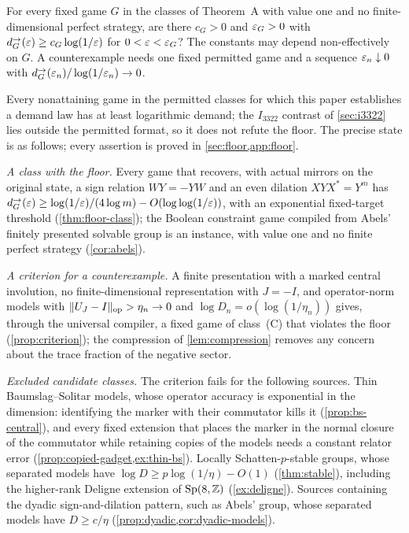 \begin{problem}\label{prob:floor}
For every fixed game $G$ in the classes of Theorem~A with value one and no finite-dimensional perfect strategy, are there $c_G>0$ and
$\varepsilon_G>0$ with $d^\to_G(\varepsilon)\ge c_G\log(1/\varepsilon)$ for $0<\varepsilon<\varepsilon_G$? The constants may depend non-effectively on $G$. A counterexample
needs one fixed permitted game and a sequence $\varepsilon_n\downarrow0$ with $d^\to_G(\varepsilon_n)/\log(1/\varepsilon_n)\to0$.
\end{problem}

Every nonattaining game in the permitted classes for which this paper establishes a demand law has at least logarithmic demand;
the $I_{3322}$ contrast of \cref{sec:i3322} lies outside the permitted format, so it does not refute the floor. The precise state is as follows; every assertion is proved in \cref{sec:floor,app:floor}.

\emph{A class with the floor.} Every game that recovers, with actual mirrors on the original state, a sign relation $WY=-YW$ and an
even dilation $XYX^*=Y^m$ has $d^\to_G(\varepsilon)\ge\log(1/\varepsilon)/(4\log m)-O(\log\log(1/\varepsilon))$, with an exponential fixed-target
threshold (\cref{thm:floor-class}); the Boolean constraint game compiled from Abels' finitely presented solvable group is an
instance, with value one and no finite perfect strategy (\cref{cor:abels}).

\emph{A criterion for a counterexample.} A finite presentation with a marked central involution, no finite-dimensional
representation with $J=-I$, and operator-norm models with $\lVert U_J-I\rVert_{\mathrm{op}}>\eta_n\to0$ and $\log D_n=o(\log(1/\eta_n))$ gives, through
the universal compiler, a fixed game of class~(C) that violates the floor (\cref{prop:criterion}); the compression of
\cref{lem:compression} removes any concern about the trace fraction of the negative sector.

\emph{Excluded candidate classes.} The criterion fails for the following sources. Thin Baumslag--Solitar models, whose operator
accuracy is exponential in the dimension: identifying the marker with their commutator kills it (\cref{prop:bs-central}), and every
fixed extension that places the marker in the normal closure of the commutator while retaining copies of the models needs a constant
relator error (\cref{prop:copied-gadget,ex:thin-bs}). Locally Schatten-$p$-stable groups, whose separated models have
$\log D\ge p\log(1/\eta)-O(1)$ (\cref{thm:stable}), including the higher-rank Deligne extension of $\mathrm{Sp}(8,\mathbb Z)$ (\cref{ex:deligne}).
Sources containing the dyadic sign-and-dilation pattern, such as Abels' group, whose separated models have $D\ge c/\eta$
(\cref{prop:dyadic,cor:dyadic-models}).

